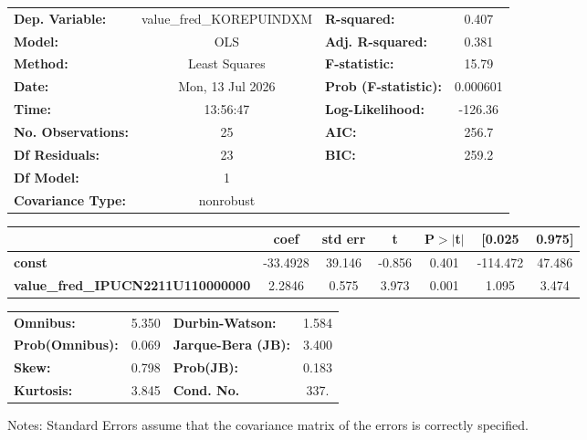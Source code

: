 \begin{center}
\begin{tabular}{lclc}
\toprule
\textbf{Dep. Variable:}                   & value\_fred\_KOREPUINDXM & \textbf{  R-squared:         } &     0.407   \\
\textbf{Model:}                           &           OLS            & \textbf{  Adj. R-squared:    } &     0.381   \\
\textbf{Method:}                          &      Least Squares       & \textbf{  F-statistic:       } &     15.79   \\
\textbf{Date:}                            &     Mon, 13 Jul 2026     & \textbf{  Prob (F-statistic):} &  0.000601   \\
\textbf{Time:}                            &         13:56:47         & \textbf{  Log-Likelihood:    } &   -126.36   \\
\textbf{No. Observations:}                &              25          & \textbf{  AIC:               } &     256.7   \\
\textbf{Df Residuals:}                    &              23          & \textbf{  BIC:               } &     259.2   \\
\textbf{Df Model:}                        &               1          & \textbf{                     } &             \\
\textbf{Covariance Type:}                 &        nonrobust         & \textbf{                     } &             \\
\bottomrule
\end{tabular}
\begin{tabular}{lcccccc}
                                          & \textbf{coef} & \textbf{std err} & \textbf{t} & \textbf{P$> |$t$|$} & \textbf{[0.025} & \textbf{0.975]}  \\
\midrule
\textbf{const}                            &     -33.4928  &       39.146     &    -0.856  &         0.401        &     -114.472    &       47.486     \\
\textbf{value\_fred\_IPUCN2211U110000000} &       2.2846  &        0.575     &     3.973  &         0.001        &        1.095    &        3.474     \\
\bottomrule
\end{tabular}
\begin{tabular}{lclc}
\textbf{Omnibus:}       &  5.350 & \textbf{  Durbin-Watson:     } &    1.584  \\
\textbf{Prob(Omnibus):} &  0.069 & \textbf{  Jarque-Bera (JB):  } &    3.400  \\
\textbf{Skew:}          &  0.798 & \textbf{  Prob(JB):          } &    0.183  \\
\textbf{Kurtosis:}      &  3.845 & \textbf{  Cond. No.          } &     337.  \\
\bottomrule
\end{tabular}
\end{center}

Notes: \newline
 [1] Standard Errors assume that the covariance matrix of the errors is correctly specified.